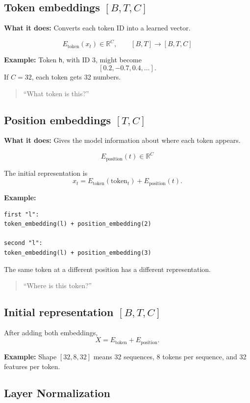 \subsection{Token embeddings \( [B,T,C] \)}

\textbf{What it does:} Converts each token ID into a learned vector.

\[
  E_{\text{token}}(x_t) \in \mathbb{R}^{C},
  \qquad
  [B,T] \longrightarrow [B,T,C]
\]

\textbf{Example:} Token \texttt{h}, with ID 3, might become
\[
  [0.2,-0.7,0.4,\ldots].
\]
If \(C=32\), each token gets 32 numbers.

\begin{quote}
  ``What token is this?''
\end{quote}

\subsection{Position embeddings \( [T,C] \)}

\textbf{What it does:} Gives the model information about where each token
appears.

\[
  E_{\text{position}}(t) \in \mathbb{R}^{C}
\]

The initial representation is
\[
  x_t = E_{\text{token}}(\text{token}_t)
        + E_{\text{position}}(t).
\]

\textbf{Example:}
\begin{verbatim}
first "l":
token_embedding(l) + position_embedding(2)

second "l":
token_embedding(l) + position_embedding(3)
\end{verbatim}

The same token at a different position has a different representation.

\begin{quote}
  ``Where is this token?''
\end{quote}

\subsection{Initial representation \( [B,T,C] \)}

After adding both embeddings,
\[
  X = E_{\text{token}} + E_{\text{position}}.
\]

\textbf{Example:} Shape \([32,8,32]\) means 32 sequences, 8 tokens per
sequence, and 32 features per token.

\subsection{Layer Normalization}

